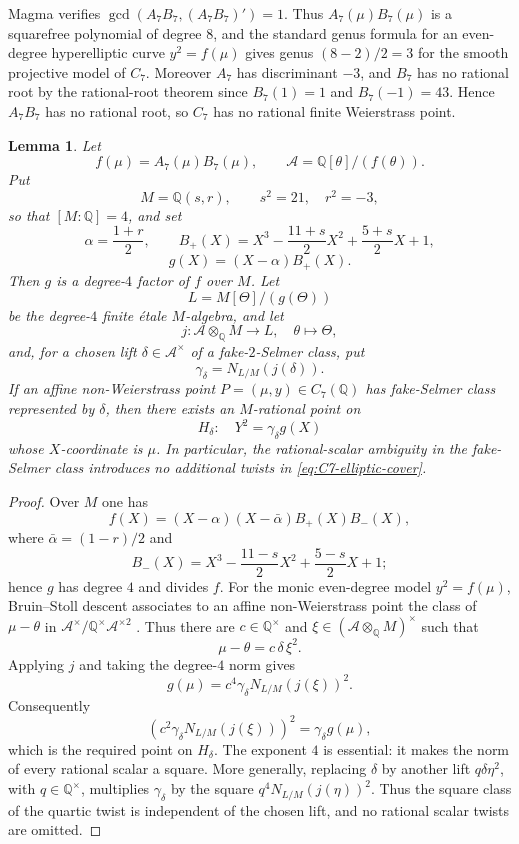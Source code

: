 \documentclass[11pt,a4paper]{amsart}
\newtheorem{lemma}[theorem]{Lemma}
\theoremstyle{definition}
\theoremstyle{remark}
\numberwithin{equation}{section}
\newcommand{\Q}{\mathbb{Q}}
\begin{document}
Magma verifies \(\gcd(A_7B_7,(A_7B_7)')=1\). Thus \(A_7(\mu)B_7(\mu)\) is a squarefree polynomial of degree \(8\), and the standard genus formula for an even-degree hyperelliptic curve \(y^2=f(\mu)\) gives genus \((8-2)/2=3\) for the smooth projective model of \(C_7\). Moreover \(A_7\) has discriminant \(-3\), and \(B_7\) has no rational root by the rational-root theorem since \(B_7(1)=1\) and \(B_7(-1)=43\). Hence \(A_7B_7\) has no rational root, so \(C_7\) has no rational finite Weierstrass point.

\begin{lemma}\label{lem:C7-cover-bridge}
Let
\[
f(\mu)=A_7(\mu)B_7(\mu),\qquad \mathscr A=\Q[\theta]/(f(\theta)).
\]
Put
\[
M=\Q(s,r),\qquad s^2=21,\quad r^2=-3,
\]
so that $[M:\Q]=4$, and set
\[
\alpha=\frac{1+r}{2},\qquad
B_+(X)=X^3-\frac{11+s}{2}X^2+\frac{5+s}{2}X+1,
\]
\[
g(X)=(X-\alpha)B_+(X).
\]
Then $g$ is a degree-$4$ factor of $f$ over $M$. Let
\[
L=M[\Theta]/(g(\Theta))
\]
be the degree-$4$ finite \'{e}tale $M$-algebra, and let
\[
j:\mathscr A\otimes_\Q M\longrightarrow L,\quad \theta\longmapsto\Theta,
\]
and, for a chosen lift $\delta\in\mathscr A^\times$ of a fake-$2$-Selmer class, put
\[
\gamma_\delta=N_{L/M}(j(\delta)).
\]
If an affine non-Weierstrass point $P=(\mu,y)\in C_7(\Q)$ has fake-Selmer class represented by $\delta$, then there exists an $M$-rational point on
\begin{equation}\label{eq:C7-elliptic-cover}
H_\delta:\quad Y^2=\gamma_\delta g(X)
\end{equation}
whose $X$-coordinate is $\mu$. In particular, the rational-scalar ambiguity in the fake-Selmer class introduces no additional twists in \eqref{eq:C7-elliptic-cover}.
\end{lemma}

\begin{proof}
Over $M$ one has
\[
f(X)=(X-\alpha)(X-\bar\alpha)B_+(X)B_-(X),
\]
where $\bar\alpha=(1-r)/2$ and
\[
B_-(X)=X^3-\frac{11-s}{2}X^2+\frac{5-s}{2}X+1;
\]
hence $g$ has degree $4$ and divides $f$. For the monic even-degree model $y^2=f(\mu)$, Bruin--Stoll descent associates to an affine non-Weierstrass point the class of $\mu-\theta$ in $\mathscr A^\times/\Q^\times\mathscr A^{\times2}$ \cite[Section~2]{bruin2009two}. Thus there are $c\in\Q^\times$ and $\xi\in(\mathscr A\otimes_\Q M)^\times$ such that
\[
\mu-\theta=c\,\delta\,\xi^2.
\]
Applying $j$ and taking the degree-$4$ norm gives
\[
g(\mu)=c^4\gamma_\delta N_{L/M}(j(\xi))^2.
\]
Consequently
\[
\left(c^2\gamma_\delta N_{L/M}(j(\xi))\right)^2
=\gamma_\delta g(\mu),
\]
which is the required point on $H_\delta$. The exponent $4$ is essential: it makes the norm of every rational scalar a square. More generally, replacing $\delta$ by another lift $q\delta\eta^2$, with $q\in\Q^\times$, multiplies $\gamma_\delta$ by the square $q^4N_{L/M}(j(\eta))^2$. Thus the square class of the quartic twist is independent of the chosen lift, and no rational scalar twists are omitted.
\end{proof}
\end{document}
